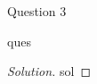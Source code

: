 \begin{solution}{Question 3}\label{ques:3}
    \begin{question}
        ques
    \end{question}
    \tcblower{}
    \begin{proof}[Solution]
        sol
    \end{proof}
\end{solution}
